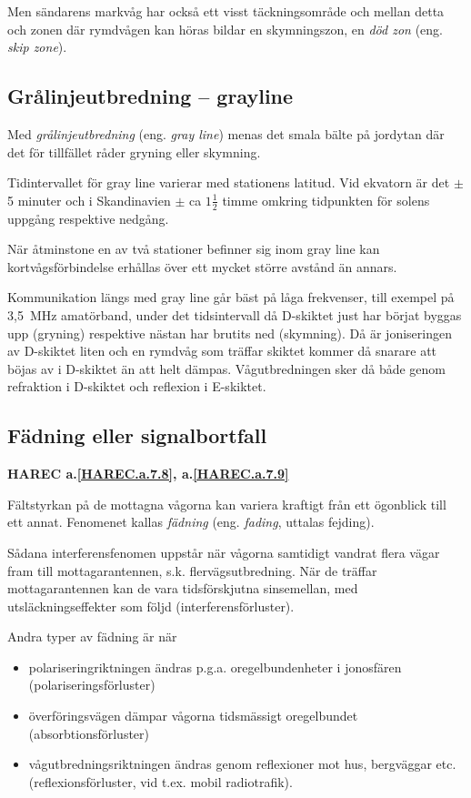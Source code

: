 Men sändarens markvåg har också ett visst täckningsområde och mellan
detta och zonen där rymdvågen kan höras bildar en skymningszon, en
\emph{död zon} (eng. \emph{skip zone}).

\subsection{Grålinjeutbredning -- grayline}

Med \emph{grålinjeutbredning} (eng. \emph{gray line}) menas det smala bälte på
jordytan där det för tillfället råder gryning eller skymning.

Tidintervallet för gray line varierar med stationens latitud.
Vid ekvatorn är det \(\pm\) 5 minuter och i Skandinavien \(\pm\) ca
\(1\frac{1}{2}\) timme omkring tidpunkten för solens uppgång
respektive nedgång.

När åtminstone en av två stationer befinner sig inom gray line kan
kortvågsförbindelse erhållas över ett mycket större avstånd än annars.

Kommunikation längs med gray line går bäst på låga frekvenser,
till exempel på 3,5~MHz amatörband, under det tidsintervall då D-skiktet just
har börjat byggas upp (gryning) respektive nästan har brutits ned (skymning).
Då är joniseringen av D-skiktet liten och en rymdvåg som
träffar skiktet kommer då snarare att böjas av i D-skiktet än att helt dämpas.
Vågutbredningen sker då både genom refraktion i D-skiktet och reflexion i
E-skiktet.

\subsection{Fädning eller signalbortfall}
\textbf{
HAREC a.\ref{HAREC.a.7.8}\label{myHAREC.a.7.8},
 a.\ref{HAREC.a.7.9}\label{myHAREC.a.7.9}
}

Fältstyrkan på de mottagna vågorna kan variera kraftigt från ett ögonblick till
ett annat.
Fenomenet kallas \emph{fädning} (eng. \emph{fading}, uttalas fejding).

Sådana interferensfenomen uppstår när vågorna samtidigt vandrat flera
vägar fram till mottagarantennen, s.k. flervägsutbredning.
När de träffar mottagarantennen kan de vara tidsförskjutna sinsemellan, med
utsläckningseffekter som följd (interferensförluster).

Andra typer av fädning är när
\begin{itemize}
\item polariseringriktningen ändras p.g.a. oregelbundenheter i
  jonosfären (polariseringsförluster)
\item överföringsvägen dämpar vågorna tidsmässigt oregelbundet
  (absorbtionsförluster)
\item vågutbredningsriktningen ändras genom reflexioner mot hus,
  bergväggar etc. (reflexionsförluster, vid t.ex. mobil radiotrafik).
\end{itemize}

